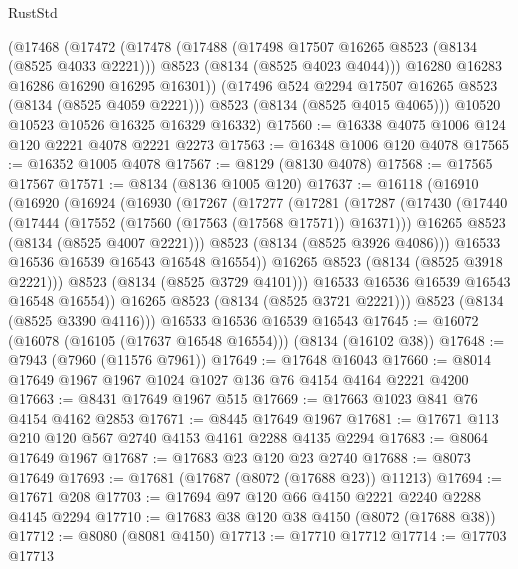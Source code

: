 \begin{lexlean}{RustStd}
\begin{coremodule}
      (@17468
        (@17472
          (@17478
            (@17488
              (@17498 @17507 @16265 @8523 (@8134 (@8525 @4033 @2221)))
              @8523
              (@8134 (@8525 @4023 @4044)))
            @16280
            @16283
            @16286
            @16290
            @16295
            @16301))
        (@17496 @524 @2294 @17507 @16265 @8523 (@8134 (@8525 @4059 @2221)))
        @8523
        (@8134 (@8525 @4015 @4065)))
      @10520
      @10523
      @10526
      @16325
      @16329
      @16332)
@17560 := @16338 @4075 @1006 @124 @120 @2221 @4078 @2221 @2273
@17563 := @16348 @1006 @120 @4078
@17565 := @16352 @1005 @4078
@17567 := @8129 (@8130 @4078)
@17568 := @17565 @17567
@17571 := @8134 (@8136 @1005 @120)
@17637 := @16118
    (@16910
      (@16920
        (@16924
          (@16930
            (@17267
              (@17277
                (@17281
                  (@17287
                    (@17430
                      (@17440
                        (@17444 (@17552 (@17560 (@17563 (@17568 @17571)) @16371)))
                        @16265
                        @8523
                        (@8134 (@8525 @4007 @2221)))
                      @8523
                      (@8134 (@8525 @3926 @4086)))
                    @16533
                    @16536
                    @16539
                    @16543
                    @16548
                    @16554))
                @16265
                @8523
                (@8134 (@8525 @3918 @2221)))
              @8523
              (@8134 (@8525 @3729 @4101)))
            @16533
            @16536
            @16539
            @16543
            @16548
            @16554))
        @16265
        @8523
        (@8134 (@8525 @3721 @2221)))
      @8523
      (@8134 (@8525 @3390 @4116)))
    @16533
    @16536
    @16539
    @16543
@17645 := @16072 (@16078 (@16105 (@17637 @16548 @16554))) (@8134 (@16102 @38))
@17648 := @7943 (@7960 (@11576 @7961))
@17649 := @17648 @16043
@17660 := @8014 @17649 @1967 @1967 @1024 @1027 @136 @76 @4154 @4164 @2221 @4200
@17663 := @8431 @17649 @1967 @515
@17669 := @17663 @1023 @841 @76 @4154 @4162 @2853
@17671 := @8445 @17649 @1967
@17681 := @17671 @113 @210 @120 @567 @2740 @4153 @4161 @2288 @4135 @2294
@17683 := @8064 @17649 @1967
@17687 := @17683 @23 @120 @23 @2740
@17688 := @8073 @17649
@17693 := @17681 (@17687 (@8072 (@17688 @23)) @11213)
@17694 := @17671 @208
@17703 := @17694 @97 @120 @66 @4150 @2221 @2240 @2288 @4145 @2294
@17710 := @17683 @38 @120 @38 @4150 (@8072 (@17688 @38))
@17712 := @8080 (@8081 @4150)
@17713 := @17710 @17712
@17714 := @17703 @17713

\end{coremodule}
\end{lexlean}
